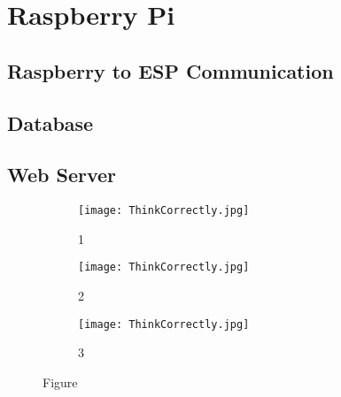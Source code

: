 \chapter{Raspberry Pi}
    \section{Raspberry to ESP Communication}
    \section{Database}
    \section{Web Server}

    \begin{figure}[h]
        \centering
        \begin{subfigure}{.4\textwidth} %
            \centering
            \texttt{[image: ThinkCorrectly.jpg]} \\
            \caption{1}
        \end{subfigure}
    
        \begin{subfigure}{.4\textwidth} %
            \centering
            \texttt{[image: ThinkCorrectly.jpg]} \\
            \caption{2}
        \end{subfigure}
        \hfill%
        \begin{subfigure}{.4\textwidth} %
            \centering
            \texttt{[image: ThinkCorrectly.jpg]} \\
            \caption{3}
            \label{fig:sub3}
        \end{subfigure}
        \caption{Figure}
    \end{figure}
